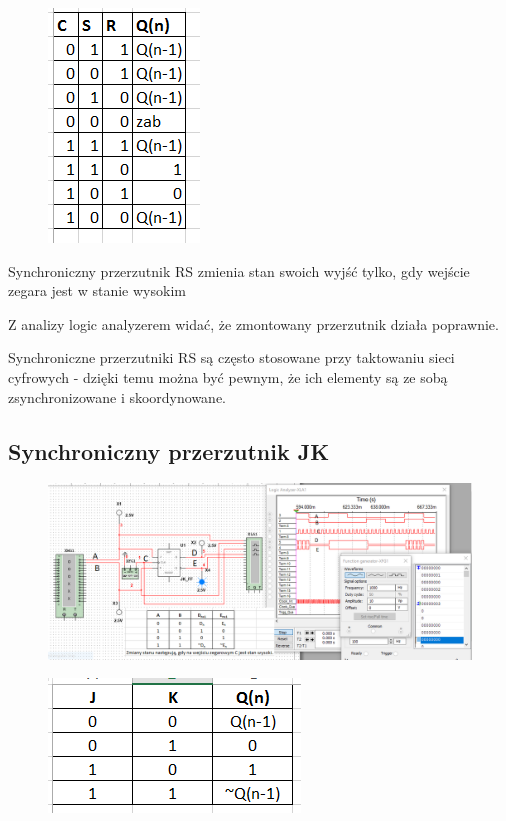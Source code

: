 \documentclass[12pt,a4paper]{article}
\begin{document}
\begin{figure}[H]
\centering
\includegraphics{img/3bTruthTable}
\end{figure}

Synchroniczny przerzutnik RS zmienia stan swoich wyjść tylko, gdy wejście zegara jest w stanie wysokim

Z analizy logic analyzerem widać, że zmontowany przerzutnik działa poprawnie. 

Synchroniczne przerzutniki RS są często stosowane przy taktowaniu sieci cyfrowych - dzięki temu można być pewnym, że ich elementy są ze sobą zsynchronizowane i skoordynowane.

\subsection{Synchroniczny przerzutnik JK}
\begin{figure}[H]
\centering
\includegraphics[width=\textwidth]{img/3c_syncJK}
\end{figure}

\begin{figure}[H]
\centering
\includegraphics{img/3cTruthTable}
\end{figure}
\end{document}

